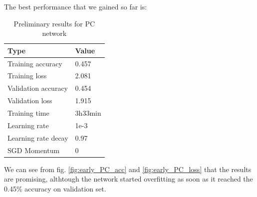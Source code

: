 The best performance that we gained so far is:
\begin{table}[!ht]
    \begin{center}
        \label{tab:PC_early_results}
        \begin{tabular}{l|l}
            \rowcolor{gray!50}
            \textbf{Type} & \textbf{Value} \\
            \hline
            Training accuracy & 0.457\\
            Training loss & 2.081\\
            Validation accuracy & 0.454\\
            Validation loss & 1.915\\
            Training time & 3h33min\\
            Learning rate & 1e-3\\
            Learning rate decay & 0.97\\
            SGD Momentum & 0\\
            \hline
        \end{tabular}
    \end{center}
    \caption{Preliminary results for PC network}
\end{table}
We can see from fig. \ref{fig:early_PC_acc} and \ref{fig:early_PC_loss} that the results are promising, althtough the network started overfitting as soon as it reached the 0.45\% accuracy on validation set.

